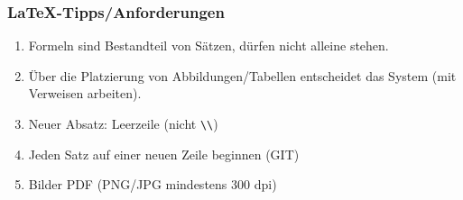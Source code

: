 %
%
%
\begin{frame}
\frametitle{\LaTeX-Tipps/Anforderungen}
\begin{enumerate}
\item<1-> Formeln sind Bestandteil von Sätzen, dürfen nicht alleine stehen.
\item<2-> Über die Platzierung von Abbildungen/Tabellen entscheidet das System
(mit Verweisen arbeiten).
\item<3-> Neuer Absatz: Leerzeile (nicht \texttt{\textbackslash\textbackslash})
\item<4-> Jeden Satz auf einer neuen Zeile beginnen (GIT)
\item<5-> Bilder PDF (PNG/JPG mindestens 300 dpi)
\end{enumerate}
\end{frame}
